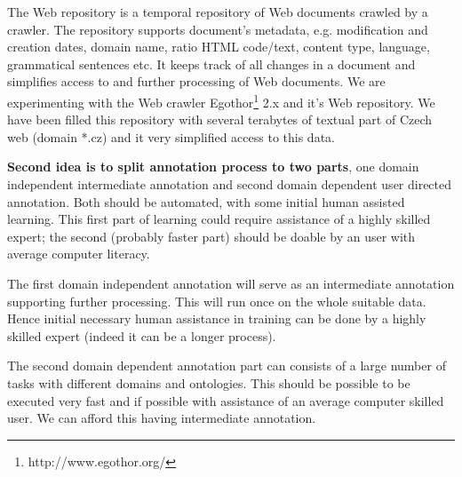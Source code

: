 \documentclass{www2009-submission}
\begin{document}
The Web repository is a temporal repository of Web documents crawled by a crawler. The repository supports document's metadata, e.g. modification and creation dates, domain name, ratio HTML code/text, content type, language, grammatical sentences etc. It keeps track of all changes in a document and simplifies access to and further processing of Web documents. We are experimenting with the Web crawler Egothor\footnote{http://www.egothor.org/} 2.x and it's Web repository. We have been filled this repository with several terabytes of textual part of Czech web (domain *.cz) and it very simplified access to this data.





\textbf{Second idea is to split annotation process to two parts}, one domain independent intermediate annotation and second domain dependent user directed annotation. Both should be automated, with some initial human assisted learning. This first part of learning could require assistance of a highly skilled expert; the second (probably faster part) should be doable by an user with average computer literacy. \par

The first domain independent annotation will serve as an intermediate annotation supporting further processing. This will run once on the whole suitable data. Hence initial necessary human assistance in training can be done by a highly skilled expert (indeed it can be a longer process).\par
The second domain dependent annotation part can consists of a large number of tasks with different domains and ontologies. This should be possible to be executed very fast and if possible with assistance of an average computer skilled user.  We can afford this having intermediate annotation. \par
\end{document}
